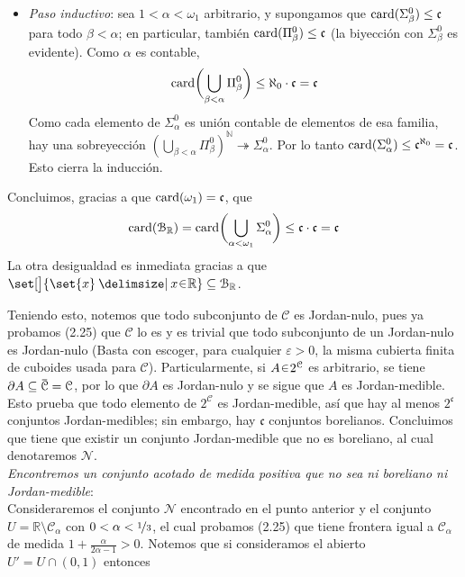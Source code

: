 \begin{sol}
\begin{enumerate}[label=(\alph*)]
\begin{itemize}
    \item\emph{Paso inductivo}: sea $1 < \alpha < \omega_1$ arbitrario, y supongamos que
    $\operatorname{card}(\Sigma^0_\beta)\le\mathfrak{c}$
    para todo $\beta<\alpha$; en particular, también $\operatorname{card}(\Pi^0_\beta)\le\mathfrak{c}$ (la biyección con $\Sigma^0_\beta$ es evidente).
    Como $\alpha$ es contable,
    \[
    \operatorname{card}\biggl(\bigcup_{\beta<\alpha}\Pi^0_\beta\biggr)
    \le
    \aleph_0\cdot\mathfrak{c} = \mathfrak{c}
    \]
    Como cada elemento de $\Sigma^0_\alpha$ es unión contable de elementos
    de esa familia, hay una sobreyección $(\bigcup_{\beta<\alpha}\Pi^0_\beta)^{\mathbb{N}} \twoheadrightarrow \Sigma^0_\alpha$. Por lo tanto $\operatorname{card}(\Sigma^0_\alpha)\le\mathfrak{c}^{\aleph_0}=\mathfrak{c}$. Esto cierra la inducción.
\end{itemize}
Concluimos, gracias a que $\operatorname{card}(\omega_1) = \mathfrak{c}$, que
\[
\operatorname{card}(\mathcal{B}_\mathbb{R})
=
\operatorname{card}\biggl(\bigcup_{\alpha<\omega_1}\Sigma^0_\alpha\biggr)
\le
\mathfrak{c}\cdot\mathfrak{c} = \mathfrak{c}
\]
La otra desigualdad es inmediata gracias a que $\set[\big]{\set{x} \given x\en\mathbb{R}} \subseteq \mathcal{B}_\mathbb{R}$.
\end{enumerate}
Teniendo esto, notemos que todo subconjunto de $\mathcal{C}$ es Jordan-nulo, pues ya probamos (2.25) que $\mathcal{C}$ lo es y es trivial que todo subconjunto de un Jordan-nulo es Jordan-nulo (Basta con escoger, para cualquier $\varepsilon>0$, la misma cubierta finita de cuboides usada para $\mathcal{C}$). Particularmente, si $A \en 2^\mathcal{C}$ es arbitrario, se tiene $\partial A \subseteq \ubar{\mathcal{C}} = \mathcal{C}$, por lo que $\partial A$ es Jordan-nulo y se sigue que $A$ es Jordan-medible. Esto prueba que todo elemento de $2^\mathcal{C}$ es Jordan-medible, así que hay al menos $2^\mathfrak{c}$ conjuntos Jordan-medibles; sin embargo, hay $\mathfrak{c}$ conjuntos borelianos. Concluimos que tiene que existir un conjunto Jordan-medible que no es boreliano, al cual denotaremos $\mathcal{N}$.\vspace{1em}\\
\emph{Encontremos un conjunto acotado de medida positiva que no sea ni boreliano ni Jordan-medible}:\\
Consideraremos el conjunto $\mathcal{N}$ encontrado en el punto anterior y el conjunto $U = \mathbb{R} \setminus\mathcal{C}_\alpha$ con $0<\alpha<\nicefrac{1}{3}$, el cual probamos (2.25) que tiene frontera igual a $\mathcal{C}_\alpha$ de medida $1+\frac{\alpha}{2\alpha-1} > 0$. Notemos que si consideramos el abierto $U' = U \cap (0,1)$ entonces

\end{sol}
